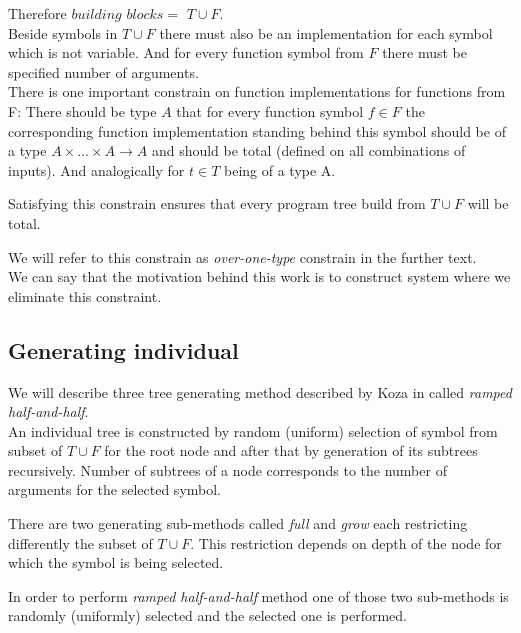 \documentclass[12pt,a4paper]{report}
\begin{document}
\newcommand{\TuF}{$T \cup F$\xspace}

Therefore $building$ $blocks = $ \TuF.\\

Beside symbols in \TuF there must also be 
an implementation for each symbol which is not variable. 
And for every function symbol from $F$ there must be specified 
number of arguments.\\

There is one important constrain on function implementations for functions from F:
There should be type $A$ that for every function symbol $f \in F$ the corresponding function implementation standing behind this symbol should be of a type 
$A \times ... \times A \rightarrow A$ and should be total (defined on all
combinations of inputs). And analogically for $t \in T$ being of a type A.  

Satisfying this constrain ensures that every program tree build 
from \TuF will be total.

We will refer to this constrain as \textit{over-one-type} constrain
in the further text.\\

We can say that the motivation behind this work is to construct system where we
eliminate this constraint. 

\subsection{Generating individual}
\label{GPgene}

We will describe three tree generating method described by Koza 
in \cite{koza92} called \textit{ramped half-and-half}. \\

An individual tree is constructed by random (uniform) selection of symbol from 
subset of \TuF for the root node and after that by generation of its 
subtrees recursively. 
Number of subtrees of a node corresponds 
to the number of arguments for the selected symbol. 

There are two generating sub-methods called \textit{full} and 
\textit{grow} each restricting differently the subset of \TuF. 
This restriction depends on depth of the
node for which the symbol is being selected. 

In order to perform \textit{ramped half-and-half} method
one of those two sub-methods is randomly (uniformly) 
selected and the selected one is performed.\\
\end{document}

